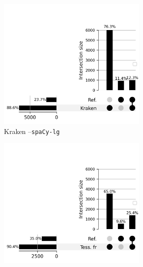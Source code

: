 \begin{figure}[h!]
    \begin{minipage}{6.5cm}
  \begin{subfigure}{1\textwidth}
  \includegraphics[width=0.8\textwidth]{REVUETAL_article_23102023/IMAGES/ELTeC_INTERSECTIONS_spaCy3.5.1_12072024/DATA_ELTeC-fra_spaCy3.5.1_Kraken_upsetplot.png} 
  \caption{Kraken --\texttt{spaCy-lg}}
  \label{fig:ELTeCFRA_Kraken_spacy-lg-concat_intersection}
  \end{subfigure}
  \end{minipage}
  \begin{minipage}{6.5cm}
  \begin{subfigure}{1\textwidth}
  \includegraphics[width=0.8\textwidth]{REVUETAL_article_23102023/IMAGES/ELTeC_INTERSECTIONS_spaCy3.5.1_12072024/DATA_ELTeC-fra_spaCy3.5.1_Tess. fr_upsetplot.png}

\end{subfigure}
\end{minipage}
\end{figure}
